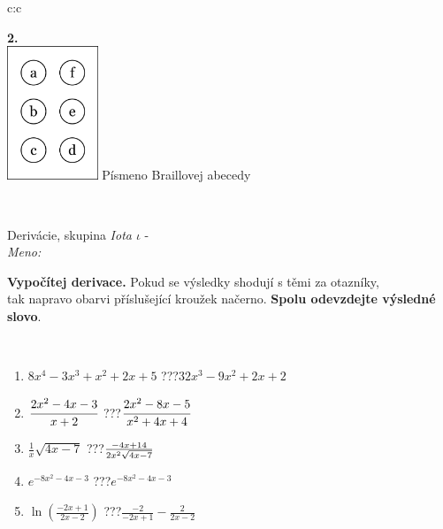 \documentclass[10pt]{report}
\begin{document}
\begin{tabular}{c:c}
\begin{minipage}[c][104.5mm][t]{0.5\linewidth}
\begin{center}
\begin{minipage}{0.20\linewidth}
\begin{center}
{\Huge\bfseries 2.} \\[2mm]
\includegraphics[height=40mm]{../images/braille.png}
{\small Písmeno Braillovej abecedy}
\end{center}
\end{minipage}
\end{center}
\end{minipage}
\\ \hdashline
\begin{minipage}[c][104.5mm][t]{0.5\linewidth}
\begin{center}
\vspace{7mm}
{\huge Derivácie, skupina \textit{Iota $\iota$} -}\\[5mm]
\textit{Meno:}\phantom{xxxxxxxxxxxxxxxxxxxxxxxxxxxxxxxxxxxxxxxxxxxxxxxxxxxxxxxxxxxxxxxxx}\\[5mm]
\begin{minipage}{0.95\linewidth}
\begin{center}
\textbf{Vypočítej derivace.} Pokud se výsledky shodují s těmi za otazníky,\\tak napravo obarvi příslušející kroužek načerno. \textbf{Spolu odevzdejte výsledné slovo}.
\end{center}
\end{minipage}
\\[1mm]
\begin{minipage}{0.79\linewidth}
\begin{center}
\begin{varwidth}{\linewidth}
\begin{enumerate}
\normalsize
\item $8x^4-3x^3+x^2+2x+5$\quad \dotfill\; ???\;\dotfill \quad $32x^3-9x^2+2x+2$
\item $\cfrac{2x^2-4x-3}{x+2}$\quad \dotfill\; ???\;\dotfill \quad $\cfrac{2x^2-8x-5}{x^2+4x+4}$
\item $\frac{1}{x}\sqrt{4x-7}$\quad \dotfill\; ???\;\dotfill \quad $\frac{-4x+14}{2x^2 \sqrt{\smash[b]{4x-7}}}$
\item $e^{-8x^2-4x-3}$\quad \dotfill\; ???\;\dotfill \quad $e^{-8x^2-4x-3}$
\item $\ln{\left(\frac{-2x+1}{2x-2}\right)}$\quad \dotfill\; ???\;\dotfill \quad $\frac{-2}{-2x+1}-\frac{2}{2x-2}$

\end{enumerate}
\end{varwidth}
\end{center}
\end{minipage}
\end{center}
\end{minipage}
\end{tabular}
\end{document}

